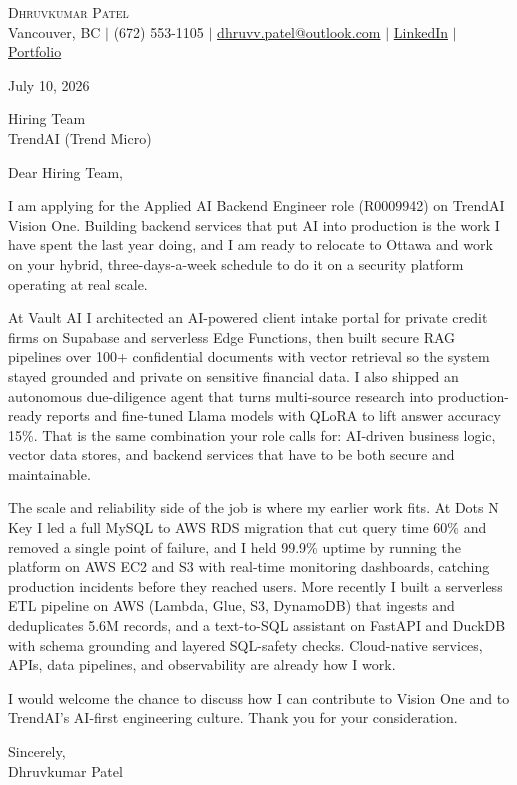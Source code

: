 \documentclass[letterpaper,11pt]{article}
\begin{document}
\begin{center}
    {\Large \scshape Dhruvkumar Patel}\\[2pt]
    \small Vancouver, BC $|$ (672) 553-1105 $|$ \href{mailto:dhruvv.patel@outlook.com}{dhruvv.patel@outlook.com} $|$
    \href{https://www.linkedin.com/in/dhruvkumarpatell/}{LinkedIn} $|$ \href{https://dhruvvkumarpatel.vercel.app/}{Portfolio}
\end{center}

\vspace{8pt}
July 10, 2026

\vspace{4pt}
Hiring Team\\
TrendAI (Trend Micro)

\vspace{8pt}
Dear Hiring Team,

I am applying for the Applied AI Backend Engineer role (R0009942) on TrendAI Vision One. Building backend services that put AI into production is the work I have spent the last year doing, and I am ready to relocate to Ottawa and work on your hybrid, three-days-a-week schedule to do it on a security platform operating at real scale.

At Vault AI I architected an AI-powered client intake portal for private credit firms on Supabase and serverless Edge Functions, then built secure RAG pipelines over 100+ confidential documents with vector retrieval so the system stayed grounded and private on sensitive financial data. I also shipped an autonomous due-diligence agent that turns multi-source research into production-ready reports and fine-tuned Llama models with QLoRA to lift answer accuracy 15\%. That is the same combination your role calls for: AI-driven business logic, vector data stores, and backend services that have to be both secure and maintainable.

The scale and reliability side of the job is where my earlier work fits. At Dots N Key I led a full MySQL to AWS RDS migration that cut query time 60\% and removed a single point of failure, and I held 99.9\% uptime by running the platform on AWS EC2 and S3 with real-time monitoring dashboards, catching production incidents before they reached users. More recently I built a serverless ETL pipeline on AWS (Lambda, Glue, S3, DynamoDB) that ingests and deduplicates 5.6M records, and a text-to-SQL assistant on FastAPI and DuckDB with schema grounding and layered SQL-safety checks. Cloud-native services, APIs, data pipelines, and observability are already how I work.

I would welcome the chance to discuss how I can contribute to Vision One and to TrendAI's AI-first engineering culture. Thank you for your consideration.

\vspace{8pt}
Sincerely,\\
Dhruvkumar Patel
\end{document}
